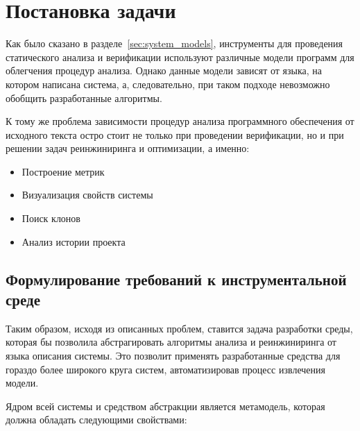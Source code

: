 \chapter{Постановка задачи}
\label{chap:task}
Как было сказано в разделе~\ref{sec:system_models}, инструменты для проведения
статического анализа и верификации используют различные модели программ для
облегчения процедур анализа. Однако данные модели зависят от языка, на котором
написана система, а, следовательно, при таком подходе невозможно обобщить
разработанные алгоритмы.

К тому же проблема зависимости процедур анализа программного обеспечения от
исходного текста остро стоит не только при проведении верификации, но и при
решении задач реинжиниринга и оптимизации, а именно:

\begin{itemize}
    \item Построение метрик
    \item Визуализация свойств системы
    \item Поиск клонов
    \item Анализ истории проекта
\end{itemize}

\section{Формулирование требований к инструментальной среде}

Таким образом, исходя из описанных проблем, ставится задача разработки среды,
которая бы позволила абстрагировать алгоритмы анализа и реинжиниринга от языка
описания системы. Это позволит применять разработанные средства для гораздо
более широкого круга систем, автоматизировав процесс извлечения модели.

Ядром всей системы и средством абстракции является метамодель, которая должна
обладать следующими свойствами:


